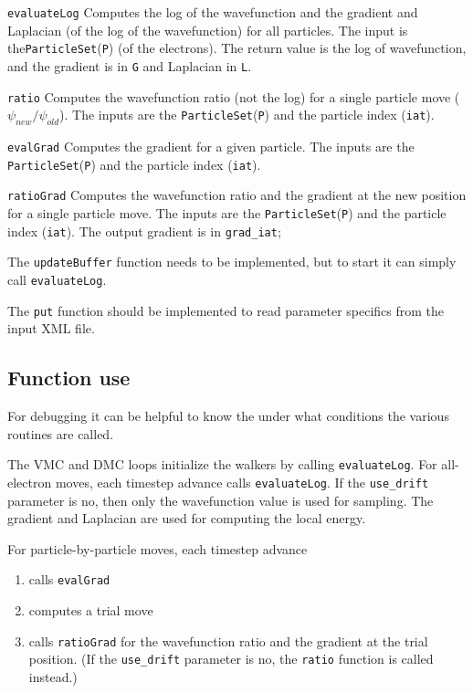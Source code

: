 \begin{description}
\item{\texttt{evaluateLog}} Computes the log of the wavefunction and the gradient
and Laplacian (of the log of the wavefunction) for all particles.
The input is the\texttt{ParticleSet}(\texttt{P}) (of the electrons).
The return value is the log of wavefunction, and the gradient is in \texttt{G} and Laplacian in \texttt{L}.

\item{\texttt{ratio}} Computes the wavefunction ratio (not the log) for a single particle move ($\psi_{new}/\psi_{old}$).
The inputs are the \texttt{ParticleSet}(\texttt{P}) and the particle index (\texttt{iat}).

\item{\texttt{evalGrad}} Computes the gradient for a given particle.
The inputs are the \texttt{ParticleSet}(\texttt{P}) and the particle index (\texttt{iat}).

\item{\texttt{ratioGrad}} Computes the wavefunction ratio and the gradient at the new position for a single particle move.
The inputs are the \texttt{ParticleSet}(\texttt{P}) and the particle index (\texttt{iat}).
The output gradient is in \texttt{grad\_iat};
\end{description}

The \texttt{updateBuffer} function needs to be implemented, but to start it can simply
call \texttt{evaluateLog}.

The \texttt{put} function should be implemented to read parameter specifics from the input XML file.

\subsection{Function use}

For debugging it can be helpful to know the under what conditions the various
routines are called.

The VMC and DMC loops initialize the walkers by calling \texttt{evaluateLog}.
For all-electron moves, each timestep advance calls \texttt{evaluateLog}.
If the \texttt{use\_drift} parameter is no, then only the wavefunction value is used for sampling.
The gradient and Laplacian are used for computing the local energy.

For particle-by-particle moves, each timestep advance
\begin{enumerate}
\item calls \texttt{evalGrad}
\item computes a trial move
\item calls \texttt{ratioGrad} for the wavefunction ratio and the gradient at the trial position.
(If the \texttt{use\_drift} parameter is no, the \texttt{ratio} function is called instead.)
\end{enumerate}


